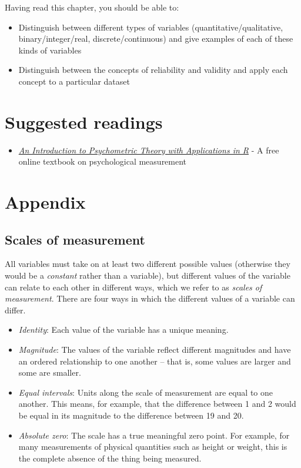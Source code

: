\documentclass[12pt,]{book}
\providecommand{\tightlist}{%
  \setlength{\itemsep}{0pt}\setlength{\parskip}{0pt}}
\theoremstyle{definition}
\theoremstyle{definition}
\theoremstyle{definition}
\theoremstyle{remark}
\begin{document}
Having read this chapter, you should be able to:

\begin{itemize}
\tightlist
\item
  Distinguish between different types of variables (quantitative/qualitative, binary/integer/real, discrete/continuous) and give examples of each of these kinds of variables
\item
  Distinguish between the concepts of reliability and validity and apply each concept to a particular dataset
\end{itemize}

\hypertarget{suggested-readings-1}{%
\section{Suggested readings}\label{suggested-readings-1}}

\begin{itemize}
\tightlist
\item
  \href{http://www.personality-project.org/r/book/}{\emph{An Introduction to Psychometric Theory with Applications in R}} - A free online textbook on psychological measurement
\end{itemize}

\hypertarget{appendix}{%
\section{Appendix}\label{appendix}}

\hypertarget{scales-of-measurement}{%
\subsection{Scales of measurement}\label{scales-of-measurement}}

All variables must take on at least two different possible values (otherwise they would be a \emph{constant} rather than a variable), but different values of the variable can relate to each other in different ways, which we refer to as \emph{scales of measurement}. There are four ways in which the different values of a variable can differ.

\begin{itemize}
\tightlist
\item
  \emph{Identity}: Each value of the variable has a unique meaning.\\
\item
  \emph{Magnitude}: The values of the variable reflect different magnitudes and have an ordered relationship to one another -- that is, some values are larger and some are smaller.
\item
  \emph{Equal intervals}: Units along the scale of measurement are equal to one another. This means, for example, that the difference between 1 and 2 would be equal in its magnitude to the difference between 19 and 20.
\item
  \emph{Absolute zero}: The scale has a true meaningful zero point. For example, for many measurements of physical quantities such as height or weight, this is the complete absence of the thing being measured.
\end{itemize}
\end{document}
